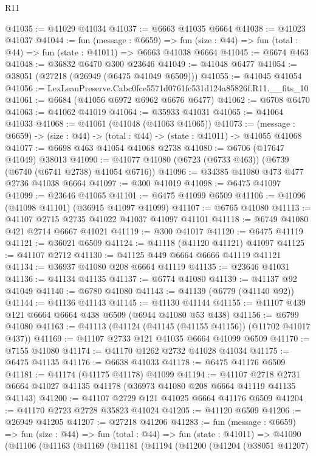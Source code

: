 \begin{lexlean}{R11}
\begin{coremodule}
@41035 := @41029 @41034
@41037 := @6663 @41035 @6664
@41038 := @41023 @41037
@41044 := fun (message : @6659) =>
  fun (size : @44) => fun (total : @44) => fun (state : @41011) => @6663 @41038 @6664
@41045 := @6674 @463
@41048 := @36832 @6470 @300 @23646
@41049 := @41048 @6477
@41054 := @38051 (@27218 (@26949 (@6475 @41049 @6509)))
@41055 := @41045 @41054
@41056 := LexLeanPreserve.Cabc0fce5571d0761fc531d124a85826f.R11.__fits_10
@41061 := @6684 (@41056 @6972 @6962 @6676 @6477)
@41062 := @6708 @6470
@41063 := @41062 @41019
@41064 := @35933 @41031
@41065 := @41064 @41033
@41068 := @41061 (@41048 (@41063 @41065))
@41073 := (message : @6659) -> (size : @44) -> (total : @44) -> (state : @41011) -> @41055 @41068
@41077 := @6698 @463 @41054 @41068 @2738
@41080 := @6706 (@17647 @41049) @38013
@41090 := @41077 @41080 (@6723 (@6733 @463)) (@6739 (@6740 (@6741 @2738) @41054 @6716))
@41096 := @34385 @41080 @473 @477 @2736 @41038 @6664
@41097 := @300 @41019
@41098 := @6475 @41097
@41099 := @23646 @41065
@41101 := @6475 @41099 @6509
@41106 := @41096 (@41098 @41101) (@36915 @41097 @41099)
@41107 := @6765 @41080
@41113 := @41107 @2715 @2735 @41022 @41037 @41097 @41101
@41118 := @6749 @41080 @421 @2714 @6667 @41021
@41119 := @300 @41017
@41120 := @6475 @41119
@41121 := @36021 @6509
@41124 := @41118 (@41120 @41121) @41097
@41125 := @41107 @2712
@41130 := @41125 @449 @6664 @6666 @41119 @41121
@41134 := @36937 @41080 @208 @6664 @41119
@41135 := @23646 @41031
@41136 := @41134 @41135
@41137 := @6774 @41080
@41139 := @41137 @92 @41049
@41140 := @6780 @41080
@41143 := @41139 (@6779 (@41140 @92))
@41144 := @41136 @41143
@41145 := @41130 @41144
@41155 := @41107 @439 @121 @6664 @6664 @438 @6509 (@6944 @41080 @53 @438)
@41156 := @6799 @41080
@41163 := @41113 (@41124 (@41145 (@41155 @41156)) (@11702 @41017 @437))
@41169 := @41107 @2733 @121 @41035 @6664 @41099 @6509
@41170 := @7155 @41080
@41174 := @41170 @1262 @2732 @41028 @41034
@41175 := @6475 @41135
@41176 := @6638 @41033
@41178 := @6475 @41176 @6509
@41181 := @41174 (@41175 @41178) @41099
@41194 := @41107
    @2718
    @2731
    @6664
    @41027
    @41135
    @41178
    (@36973 @41080 @208 @6664 @41119 @41135 @41143)
@41200 := @41107 @2729 @121 @41025 @6664 @41176 @6509
@41204 := @41170 @2723 @2728 @35823 @41024
@41205 := @41120 @6509
@41206 := @26949 @41205
@41207 := @27218 @41206
@41283 := fun (message : @6659) =>
  fun (size : @44) =>
  fun (total : @44) =>
  fun (state : @41011) =>
  @41090
    (@41106
      (@41163
        (@41169
          (@41181
            (@41194
              (@41200
                (@41204
                  (@38051 @41207)

\end{coremodule}
\end{lexlean}
